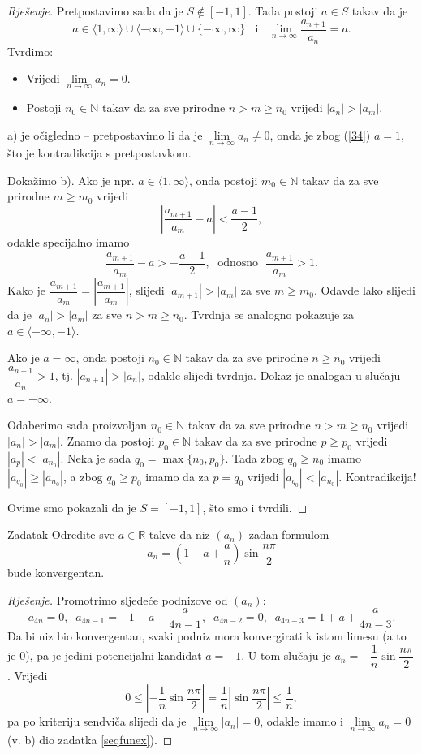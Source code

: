 \begin{proof}[Rješenje]
Pretpostavimo sada da je \(S\notin [-1, 1]\). Tada postoji  \(a\in S\) takav da je \[a\in \langle 1, \infty\rangle\cup \langle -\infty, -1\rangle\cup \{-\infty, \infty\}\;\;\text{ i }\;\;\lim\limits_{n\to \infty}{\dfrac{a_{n+1}}{a_n}}=a.\] Tvrdimo:
\begin{itemize}
\item[a)] Vrijedi \(\lim\limits_{n\to \infty}{a_n}=0\).
\item[b)] Postoji \(n_0\in \mathbb{N}\) takav da za sve prirodne \(n>m\geq n_0\) vrijedi \(|a_{n}|>|a_m|\).
\end{itemize}
a) je očigledno -- pretpostavimo li da je \(\lim\limits_{n\to \infty}{a_n}\neq 0\), onda je zbog (\ref{34}) \(a=1\), što je kontradikcija s pretpostavkom.
 
Dokažimo b). Ako je npr. \(a\in \langle 1, \infty\rangle\), onda postoji \(m_0\in \mathbb{N}\) takav da za sve prirodne \(m\geq m_0\) vrijedi \[\left\lvert \dfrac{a_{m+1}}{a_m}-a\right\rvert<\dfrac{a-1}{2},\]
odakle specijalno imamo
\[\dfrac{a_{m+1}}{a_m}-a>-\dfrac{a-1}{2},\;\text{ odnosno }\; \dfrac{a_{m+1}}{a_m}>1.\]
Kako je \(\dfrac{a_{m+1}}{a_m}=\left\lvert \dfrac{a_{m+1}}{a_m}\right\rvert\), slijedi \(|a_{m+1}|>|a_m|\) za sve \(m\geq m_0\). Odavde lako slijedi da je \(|a_{n}|>|a_m|\) za sve \(n>m\geq n_0\). Tvrdnja se analogno pokazuje za \(a\in \langle -\infty, -1\rangle\).

Ako je \(a=\infty\), onda postoji \(n_0\in \mathbb{N}\) takav da za sve prirodne \(n\geq n_0\) vrijedi \(\dfrac{a_{n+1}}{a_n}>1\), tj. \(|a_{n+1}|>|a_n|\), odakle slijedi tvrdnja. Dokaz je analogan u slučaju \(a=-\infty\).

Odaberimo sada proizvoljan \(n_0\in \mathbb{N}\) takav da za sve prirodne \(n>m\geq n_0\) vrijedi \(|a_n|>|a_m|\). Znamo da postoji \(p_0\in \mathbb{N}\) takav da za sve prirodne \(p\geq p_0\) vrijedi \(|a_p|<|a_{n_0}|\). Neka je sada \(q_0=\max\{n_0, p_0\}\). Tada zbog \(q_0\geq n_0\) imamo \(|a_{q_0}|\geq |a_{n_0}|\), a zbog \(q_0\geq p_0\) imamo da za \(p=q_0\) vrijedi \(|a_{q_0}|<|a_{n_0}|\). Kontradikcija!

Ovime smo pokazali da je \(S=[-1, 1]\), što smo i tvrdili.
\end{proof}
\begin{exercise}{Zadatak}
Odredite sve \(a\in \mathbb{R}\) takve da niz \((a_n)\) zadan formulom \[a_n=\left(1+a+\dfrac{a}{n}\right)\sin{\dfrac{n\pi}{2}}\]
bude konvergentan.
\end{exercise}
\begin{proof}[Rješenje]
Promotrimo sljedeće podnizove od \((a_n)\):
\[a_{4n}=0,\;\;a_{4n-1}=-1-a-\dfrac{a}{4n-1},\;\;a_{4n-2}=0,\;\;a_{4n-3}=1+a+\dfrac{a}{4n-3}.\]
Da bi niz bio konvergentan, svaki podniz mora konvergirati k istom limesu (a to je \(0\)), pa je jedini potencijalni kandidat \(a=-1\). U tom slučaju je \(a_n=-\dfrac{1}{n}\sin{\dfrac{n\pi}{2}}\). Vrijedi
\[0\leq \left\lvert -\dfrac{1}{n}\sin{\dfrac{n\pi}{2}}\right\rvert=\dfrac{1}{n}\left\lvert \sin{\dfrac{n\pi}{2}}\right\rvert\leq \dfrac{1}{n},\]
pa po kriteriju sendviča slijedi da je \(\lim\limits_{n\to \infty}{|a_n|}=0\), odakle imamo i \(\lim\limits_{n\to \infty}{a_n}=0\) (v. b) dio zadatka \ref{seqfunex}).
\end{proof}
